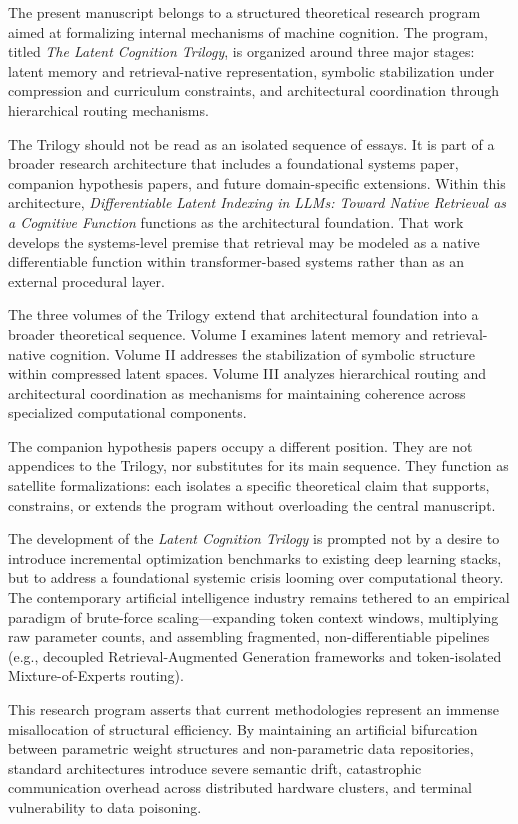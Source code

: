The present manuscript belongs to a structured theoretical research program aimed at formalizing internal mechanisms of machine cognition. The program, titled \textit{The Latent Cognition Trilogy}, is organized around three major stages: latent memory and retrieval-native representation, symbolic stabilization under compression and curriculum constraints, and architectural coordination through hierarchical routing mechanisms.

The Trilogy should not be read as an isolated sequence of essays. It is part of a broader research architecture that includes a foundational systems paper, companion hypothesis papers, and future domain-specific extensions. Within this architecture, \textit{Differentiable Latent Indexing in LLMs: Toward Native Retrieval as a Cognitive Function} functions as the architectural foundation. That work develops the systems-level premise that retrieval may be modeled as a native differentiable function within transformer-based systems rather than as an external procedural layer.

The three volumes of the Trilogy extend that architectural foundation into a broader theoretical sequence. Volume I examines latent memory and retrieval-native cognition. Volume II addresses the stabilization of symbolic structure within compressed latent spaces. Volume III analyzes hierarchical routing and architectural coordination as mechanisms for maintaining coherence across specialized computational components.

The companion hypothesis papers occupy a different position. They are not appendices to the Trilogy, nor substitutes for its main sequence. They function as satellite formalizations: each isolates a specific theoretical claim that supports, constrains, or extends the program without overloading the central manuscript.

The development of the \textit{Latent Cognition Trilogy} is prompted not by a desire to introduce incremental optimization benchmarks to existing deep learning stacks, but to address a foundational systemic crisis looming over computational theory. The contemporary artificial intelligence industry remains tethered to an empirical paradigm of brute-force scaling---expanding token context windows, multiplying raw parameter counts, and assembling fragmented, non-differentiable pipelines (e.g., decoupled Retrieval-Augmented Generation frameworks and token-isolated Mixture-of-Experts routing). 

This research program asserts that current methodologies represent an immense misallocation of structural efficiency. By maintaining an artificial bifurcation between parametric weight structures and non-parametric data repositories, standard architectures introduce severe semantic drift, catastrophic communication overhead across distributed hardware clusters, and terminal vulnerability to data poisoning.

